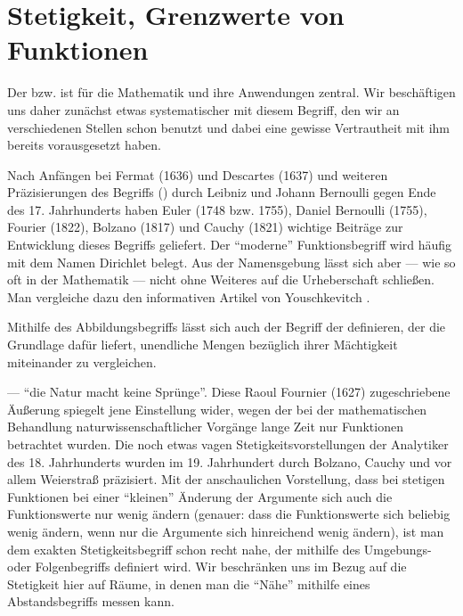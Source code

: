 \chapter{Stetigkeit, Grenzwerte von Funktionen}

Der  bzw.  
ist für die Mathematik und ihre Anwendungen zentral. 
Wir beschäftigen uns daher zunächst etwas systematischer mit diesem 
Begriff, den wir an verschiedenen Stellen schon benutzt und dabei 
eine gewisse Vertrautheit mit ihm bereits vorausgesetzt haben.

Nach Anfängen bei Fermat (1636) und 
Descartes (1637) und weiteren 
Präzisierungen des Begriffs  () 
durch Leibniz und Johann Bernoulli gegen Ende 
des 17. Jahrhunderts haben Euler 
(1748 bzw. 1755), Daniel Bernoulli (1755), Fourier (1822), 
Bolzano (1817) und Cauchy (1821) wichtige Beiträge 
zur Entwicklung dieses Begriffs geliefert. 
Der "`moderne"' Funktionsbegriff wird häufig mit dem Namen Dirichlet belegt. 
Aus der Namensgebung lässt sich aber --- wie so oft in der Mathematik --- 
nicht ohne Weiteres auf die Urheberschaft schließen. 
Man vergleiche dazu den informativen Artikel von Youschkevitch \citep{Yousch}.

Mithilfe des Abbildungsbegriffs lässt sich auch der Begriff der 
 definieren, 
der die Grundlage dafür liefert, unendliche 
Mengen bezüglich ihrer Mächtigkeit miteinander zu vergleichen.

 --- "`die Natur macht keine Sprünge"'. 
Diese Raoul Fournier (1627) zugeschriebene Äußerung spiegelt 
jene Einstellung wider, 
wegen der bei der mathematischen Behandlung naturwissenschaftlicher 
Vorgänge lange Zeit nur  Funktionen betrachtet wurden. 
Die noch etwas vagen Stetigkeitsvorstellungen der Analytiker des 18. 
Jahrhunderts wurden im 19. Jahrhundert durch Bolzano, Cauchy und vor allem 
Weierstraß präzisiert. Mit der anschaulichen Vorstellung, dass bei stetigen 
Funktionen bei einer "`kleinen"' Änderung der Argumente sich auch die 
Funktionswerte nur wenig ändern (genauer: dass die Funktionswerte sich 
beliebig wenig ändern, wenn nur die Argumente sich hinreichend wenig ändern), 
ist man dem exakten Stetigkeitsbegriff schon recht nahe, der mithilfe 
des Umgebungs- oder Folgenbegriffs definiert wird. Wir beschränken uns im 
Bezug auf die Stetigkeit hier auf  Räume, in denen 
man die "`Nähe"' mithilfe eines Abstandsbegriffs messen kann.

